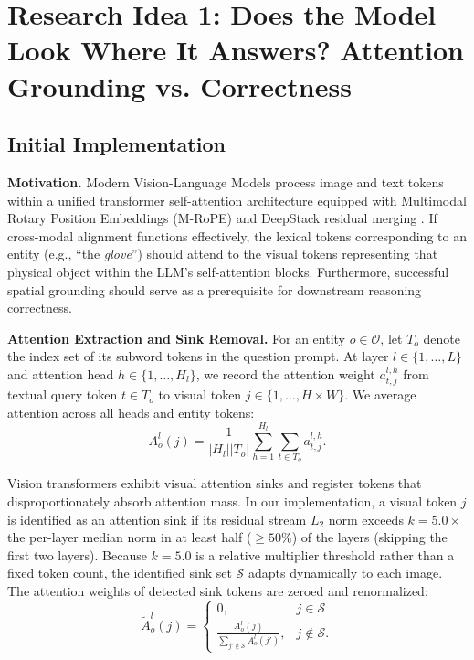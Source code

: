 \documentclass{article}
\begin{document}
\section{Research Idea 1: Does the Model Look Where It Answers? Attention Grounding vs. Correctness}

\subsection{Initial Implementation}

\textbf{Motivation.} Modern Vision-Language Models process image and text tokens within a unified transformer self-attention architecture equipped with Multimodal Rotary Position Embeddings (M-RoPE) and DeepStack residual merging \citep{meng2024deepstack}. If cross-modal alignment functions effectively, the lexical tokens corresponding to an entity (e.g., ``the \textit{glove}'') should attend to the visual tokens representing that physical object within the LLM's self-attention blocks. Furthermore, successful spatial grounding should serve as a prerequisite for downstream reasoning correctness.

\textbf{Attention Extraction and Sink Removal.} For an entity $o \in \mathcal{O}$, let $T_o$ denote the index set of its subword tokens in the question prompt. At layer $l \in \{1, \dots, L\}$ and attention head $h \in \{1, \dots, H_l\}$, we record the attention weight $a^{l,h}_{t,j}$ from textual query token $t \in T_o$ to visual token $j \in \{1, \dots, H \times W\}$. We average attention across all heads and entity tokens:
\begin{equation}
    A^l_o(j) = \frac{1}{|H_l| |T_o|} \sum_{h=1}^{H_l} \sum_{t \in T_o} a^{l,h}_{t,j}.
\end{equation}

Vision transformers exhibit visual attention sinks and register tokens \citep{darcet2024vision, kang2025visual} that disproportionately absorb attention mass. In our implementation, a visual token $j$ is identified as an attention sink if its residual stream $L_2$ norm exceeds $k = 5.0 \times$ the per-layer median norm in at least half ($\ge 50\%$) of the layers (skipping the first two layers). Because $k=5.0$ is a relative multiplier threshold rather than a fixed token count, the identified sink set $\mathcal{S}$ adapts dynamically to each image. The attention weights of detected sink tokens are zeroed and renormalized:
\begin{equation}
    \tilde{A}^l_o(j) = \begin{cases} 
    0, & j \in \mathcal{S} \\ 
    \frac{A^l_o(j)}{\sum_{j' \notin \mathcal{S}} A^l_o(j')}, & j \notin \mathcal{S}.
    \end{cases}
\end{equation}
\end{document}
